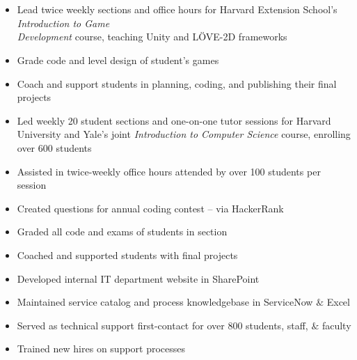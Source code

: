 \documentclass[hidelinks, 11pt]{article}
\begin{document}
\section*{}
\begin{addmargin}{.5in}

    \begin{itemize}\setlength\itemsep{-4pt}
      \item{Lead twice weekly sections and office hours for Harvard Extension School's \emph{Introduction to Game\\ Development} course, teaching Unity and LÖVE-2D frameworks}
      \item{Grade code and level design of student's games}
      \item{Coach and support students in planning, coding, and publishing their final projects}
    \end{itemize}
    \begin{itemize}\setlength\itemsep{-4pt}
      \item{Led weekly 20 student sections and one-on-one tutor sessions for Harvard University and Yale's joint \emph{Introduction to Computer Science} course, enrolling over 600 students}
      \item{Assisted in twice-weekly office hours attended by over 100 students per session}
      \item{Created questions for annual coding contest – via HackerRank}
      \item{Graded all code and exams of students in section}
      \item{Coached and supported students with final projects}
    \end{itemize}
    \begin{itemize}\setlength\itemsep{-4pt}
        \item{Developed internal IT department website in SharePoint}
          \item{Maintained service catalog and process knowledgebase in ServiceNow $\&$ Excel}
          \item{Served as technical support first-contact for over 800 students, staff, $\&$ faculty}
          \item{Trained new hires on support processes}
      \end{itemize}
\end{addmargin}
\vspace{-6pt}

\end{document}
